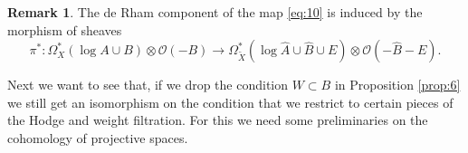 \documentclass[11pt,a4paper]{amsart}
\newcommand{\caO}{\mathcal{O}}
\numberwithin{equation}{section}
\theoremstyle{plain}
\theoremstyle{definition}
\newtheorem{rmk}[prop]{Remark}
\begin{document}
\begin{rmk}\label{rem:3}
  The de Rham component of the map \eqref{eq:10} is induced by the
  morphism of sheaves 
  \begin{equation}\label{eq:25}
    \pi ^{\ast}\colon
    \Omega ^{\ast}_{X}(\log A\cup B)\otimes \caO(-B)\longrightarrow
    \Omega ^{\ast}_{\widetilde X}(\log \widehat A\cup \widehat B\cup
    E)\otimes \caO(-\widehat B-E).
  \end{equation}
\end{rmk}

Next we want to see that, if we drop the condition $W\subset B$ in
Proposition \ref{prop:6} we still get an isomorphism on the condition
that we restrict to
certain pieces of the Hodge and weight filtration. For this we need
some preliminaries on the cohomology of projective spaces.  
\end{document}
